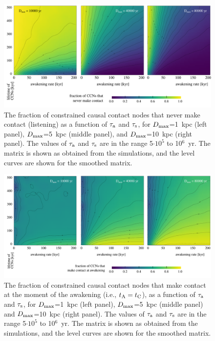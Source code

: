 \documentclass[crop]{CSLB}
\begin{document}
\begin{figure} %
   \centering
   \includegraphics[width=\textwidth]{F_never_contact.pdf}
   \caption{
   The fraction of constrained causal contact nodes that never make contact (listening) as a
   function of $\tau_{\rm a}$ and $\tau_{\rm s}$, for 
   $D_{\rm max}$=1~kpc (left panel),
   $D_{\rm max}$=5~kpc (middle panel), and
   $D_{\rm max}$=10~kpc (right panel).
   The values of $\tau_{\rm a}$ and $\tau_{\rm s}$ are in the range
   5$\cdot10^5$ to 10$^6$~yr.
   The matrix is shown as obtained from the simulations, and the level
   curves are shown for the smoothed matrix.
   }
   \label{F_never_contact}
\end{figure}
 
\begin{figure} %
   \centering
   \includegraphics[width=\textwidth]{F_C_at_A.pdf}
   \caption{
   The fraction of constrained causal contact nodes that make contact at the moment of the
   awakening (i.e., $t_{\rm A}=t_{\rm C}$), as a function of $\tau_{\rm a}$ and $\tau_{\rm s}$, for
   $D_{\rm max}$=1~kpc (left panel),
   $D_{\rm max}$=5~kpc (middle panel) and
   $D_{\rm max}$=10~kpc (right panel).
   The values of $\tau_{\rm a}$ and $\tau_{\rm s}$ are in the range
   5$\cdot10^5$ to 10$^6$~yr.
   The matrix is shown as obtained from the simulations, and the level
   curves are shown for the smoothed matrix.
   }
   \label{F_C_at_A}
\end{figure}
\end{document}
